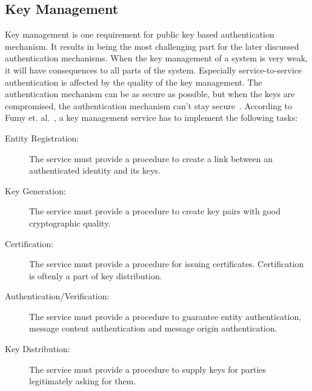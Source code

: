 \subsection{Key Management} \label{sec:key_management}
Key management is one requirement for public key based authentication mechanism.
It results in being the most challenging part for the later discussed authentication mechanisms.
When the key management of a system is very weak, it will have consequences to all parts of the system.
Especially service-to-service authentication is affected by the quality of the key management.
The authentication mechanism can be as secure as possible, but when the keys are compromised, the authentication mechanism can't stay secure~\cite{dias2020microservices, fumy1993principles}.
According to Fumy et. al.~\cite{fumy1993principles}, a key management service has to implement the following tasks:
\begin{description}
	\item[Entity Registration:] The service must provide a procedure to create a link between an authenticated identity and its keys.
	\item[Key Generation:] The service must provide a procedure to create key pairs with good cryptographic quality.
	\item[Certification:] The service must provide a procedure for issuing certificates. Certification is oftenly a part of key distribution.
	\item[Authentication/Verification:] The service must provide a procedure to guarantee entity authentication, message content authentication and message origin authentication.
	\item[Key Distribution:] The service must provide a procedure to supply keys for parties legitimately asking for them.
\end{description}

